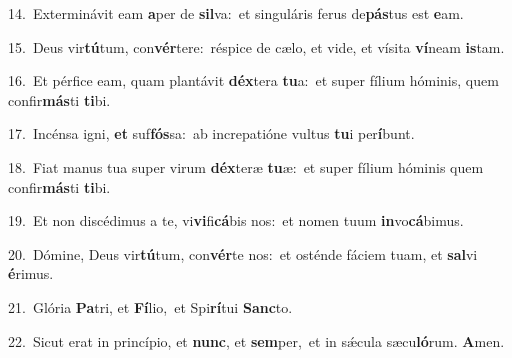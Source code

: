 {\numbfont\textcolor{\numbcolor}{14.}}~Exterminávit eam \textbf{a}\-per de \textbf{sil}\-va:~\star et singuláris ferus de\-\textbf{pás}\-tus est \textbf{e}\-am.\par
{\numbfont\textcolor{\numbcolor}{15.}}~Deus vir\-\textbf{tú}\-tum, con\-\textbf{vér}\-tere:~\star réspice de cælo, et vide, et vísita \textbf{ví}\-neam \textbf{is}\-tam.\par
{\numbfont\textcolor{\numbcolor}{16.}}~Et pérfice eam, quam plantávit \textbf{déx}\-tera \textbf{tu}\-a:~\star et super fílium hóminis, quem confir\-\textbf{más}\-ti \textbf{ti}\-bi.\par
{\numbfont\textcolor{\numbcolor}{17.}}~Incénsa igni, \textbf{et} suf\-\textbf{fós}\-sa:~\star ab increpatióne vultus \textbf{tu}\-i per\-\textbf{í}\-bunt.\par
{\numbfont\textcolor{\numbcolor}{18.}}~Fiat manus tua super virum \textbf{déx}\-teræ \textbf{tu}\-æ:~\star et super fílium hóminis quem confir\-\textbf{más}\-ti \textbf{ti}\-bi.\par
{\numbfont\textcolor{\numbcolor}{19.}}~Et non discédimus a te, vi\-\textbf{vi}\-fi\-\textbf{cá}\-bis nos:~\star et nomen tuum \textbf{in}\-vo\-\textbf{cá}\-bimus.\par
{\numbfont\textcolor{\numbcolor}{20.}}~Dómine, Deus vir\-\textbf{tú}\-tum, con\-\textbf{vér}\-te nos:~\star et osténde fáciem tuam, et \textbf{sal}\-vi \textbf{é}\-rimus.\par
{\numbfont\textcolor{\numbcolor}{21.}}~Glória \textbf{Pa}\-tri, et \textbf{Fí}\-lio,~\star et Spi\-\textbf{rí}\-tui \textbf{Sanc}\-to.\par
{\numbfont\textcolor{\numbcolor}{22.}}~Sicut erat in princípio, et \textbf{nunc}\-, et \textbf{sem}\-per,~\star et in sǽcula sæcu\-\textbf{ló}\-rum. \textbf{A}\-men.\par
